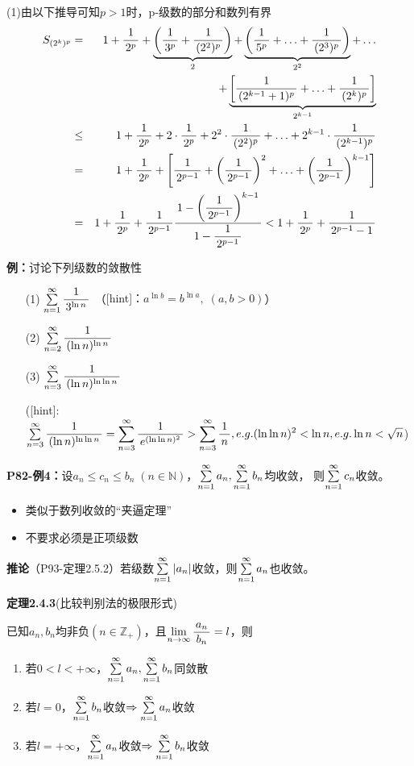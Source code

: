 (1)由以下推导可知$p>1$时，p-级数的部分和数列有界
\begin{eqnarray*}
	S_{(2^k)^p}&=&1+\df 1{2^p}+\underbrace{\left(\df1{3^p}+\df1{(2^2)^p}\right)}_2
				+\underbrace{\left(\df1{5^p}+\ldots+\df1{(2^3)^p}\right)}_{2^2}+\ldots\\
				&&+\underbrace{\left[\df1{(2^{k-1}+1)^p}+\ldots+\df1{(2^k)^p}\right]}_{2^{k-1}}\\
			  &\leq &1+\df 1{2^p}+2\cdot\df1{2^p}+2^2\cdot\df1{(2^2)^p}
			    +\ldots+2^{k-1}\cdot\df1{(2^{k-1})^p}\\
			  &=&1+\df 1{2^p}+\left[\df1{2^{p-1}}+\left(\df1{2^{p-1}}\right)^2+
			    \ldots+\left(\df1{2^{p-1}}\right)^{k-1}\right]\\
			  &=&1+\df 1{2^p}+\df1{2^{p-1}}\df{1-\left(\df1{2^{p-1}}\right)
			    ^{k-1}}{1-\df1{2^{p-1}}}<1+\df 1{2^p}+\df1{2^{p-1}-1}
\end{eqnarray*}

{\bf 例：}讨论下列级数的敛散性
\begin{enumerate}[(1)]
  \setlength{\itemindent}{1cm}
  \item[(1)] $\sumn\df{1}{3^{\ln n}}$
  \hfill（{[hint]：$a^{\ln b}=b^{\ln a},\;(a,b>0)$}）
  \item[(2)] $\sum\limits_{n=2}^{\infty}\df 1{(\ln n)^{\ln n}}$
  \item[(3)] $\sum\limits_{n=3}^{\infty}\df 1{(\ln n)^{\ln\ln n}}$
  
  ([hint]: $\sum\limits_{n=3}^{\infty}\df 1{(\ln n)^{\ln\ln n}}=
  \sum\limits_{n=3}^{\infty}\df 1{e^{(\ln\ln
  n)^2}}>\sum\limits_{n=3}^{\infty}\df 1n,e.g. (\ln\ln n)^2<\ln n,e.g. \ln
  n<\sqrt{n}$)
\end{enumerate}

{\bf P82-例4：}设$a_n\leq c_n\leq b_n\;(n\in\mathbb{N})$，$\sumn a_n,\sumn b_n$均收敛，
则$\sumn c_n$收敛。
\begin{itemize}
  \setlength{\itemindent}{1cm}
  \item 类似于数列收敛的“夹逼定理”
  \item 不要求必须是正项级数
\end{itemize}

{\bf 推论}（P93-定理2.5.2）若级数$\sumn|a_n|$收敛，则$\sumn a_n$也收敛。

{\bf 定理2.4.3}(比较判别法的极限形式)

已知$a_n,b_n$均非负$(n\in\mathbb{Z}_+)$，且$\limn\df{a_n}{b_n}=l$，则 
\begin{enumerate}
  \setlength{\itemindent}{1cm}
  \item 若$0<l<+\infty$，$\sumn a_n,\sumn b_n$同敛散 
  \item 若$l=0$，$\sumn b_n$收敛$\Rightarrow\sumn a_n$收敛 
  \item 若$l=+\infty$，$\sumn a_n$收敛$\Rightarrow\sumn b_n$收敛
\end{enumerate}

